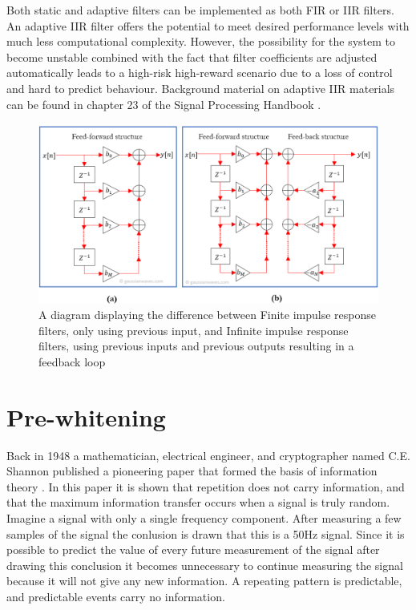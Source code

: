 Both static and adaptive filters can be implemented as both FIR or IIR filters. An adaptive IIR filter offers the potential to meet desired performance levels with much less computational complexity. However, the possibility for the system to become unstable combined with the fact that filter coefficients are adjusted automatically leads to a high-risk high-reward scenario due to a loss of control and hard to predict behaviour. Background material on adaptive IIR materials can be found in chapter 23 of the Signal Processing Handbook \cite{digital_signal_processing_handbook}.

\begin{figure}[h!t]
	\begin{center}
		\includegraphics[width=1.0\columnwidth]{images/fir_vs_iir_diagram.png}
	\end{center}
	\caption{A diagram displaying the difference between Finite impulse response filters, only using previous input, and Infinite impulse response filters, using previous inputs and previous outputs resulting in a feedback loop \cite{fir_vs_iir_diagram}}
	\label{fig:fir_vs_iir_diagram}
\end{figure}


\section{Pre-whitening}
Back in 1948 a mathematician, electrical engineer, and cryptographer named C.E. Shannon published a pioneering paper that formed the basis of information theory \cite{shannon}. In this paper it is shown that repetition does not carry information, and that the maximum information transfer occurs when a signal is truly random. Imagine a signal with only a single frequency component. After measuring a few samples of the signal the conlusion is drawn that this is a 50Hz signal. Since it is possible to predict the value of every future measurement of the signal after drawing this conclusion it becomes unnecessary to continue measuring the signal because it will not give any new information. A repeating pattern is predictable, and predictable events carry no information.


